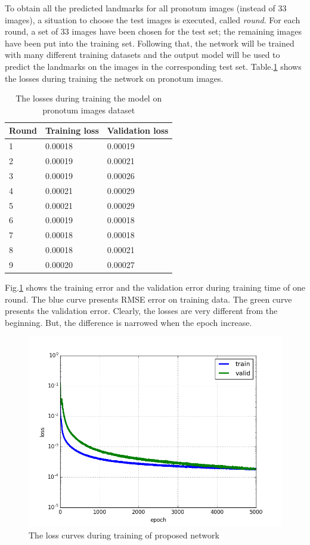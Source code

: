 \documentclass[10pt]{article}
\begin{document}
To obtain all the predicted landmarks for all pronotum images (instead of $33$ images), a situation to choose the test images is executed, called \textit{round}. For each round, a set of 33 images have been chosen for the test set; the remaining images have been put into the training set. Following that, the network will be trained with many different training datasets and the output model will be used to predict the landmarks on the images in the corresponding test set. Table.\ref{tbltrainingloss} shows the losses during training the network on pronotum images.

\begin{table}[h!]
	\centering
	\begin{tabular}{l l l}
	Round & Training loss & Validation loss \\ \hline
	1 & 0.00018 & 0.00019  \\ \hline
	2 & 0.00019 & 0.00021 \\ \hline
	3 & 0.00019 & 0.00026 \\ \hline
	4 & 0.00021 & 0.00029 \\ \hline
	5 & 0.00021 & 0.00029 \\ \hline
	6 & 0.00019 & 0.00018 \\ \hline
	7 & 0.00018 & 0.00018 \\ \hline
	8 & 0.00018 & 0.00021 \\ \hline
	9 & 0.00020 & 0.00027 \\ \hline
	\end{tabular}
	\caption{The losses during training the model on pronotum images dataset}
	\label{tbltrainingloss}
\end{table}

Fig.\ref{cnnlosses} shows the training error and the validation error during training time of one round. The blue curve presents RMSE error on training data. The green curve presents the validation error. Clearly, the losses are very different from the beginning. But, the difference is narrowed when the epoch increase.

\begin{figure}[htbp]
\centering
\includegraphics[scale=0.417]{images/losses}
\caption{The loss curves during training of proposed network} 
\label{cnnlosses}
\end{figure}
\end{document}

